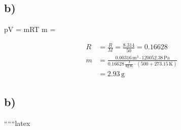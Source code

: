 

\subsection*{b)}

 \quad pV = mRT \quad \Rightarrow \quad m = 

\begin{align*}
R &= \frac{R}{M} = \frac{8.314}{50} = 0.16628 \\
m &= \frac{0.00316 \, \text{m}^3 \cdot 120052.38 \, \text{Pa}}{0.16628 \, \frac{\text{J}}{\text{kg} \cdot \text{K}} \cdot (500 + 273.15 \, \text{K})} \\
  &= 2.93 \, \text{g}
\end{align*}



\subsection*{b)}


``````latex